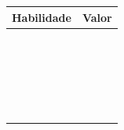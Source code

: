 \documentclass[a4paper,12pt]{article}
\begin{document}
\newpage %

\begin{multicols}{2}


\begin{center}
    \begin{tabular}{|m{6cm}|c|}
        \hline
        \textbf{Habilidade} & \textbf{Valor} \\
        \hline
        & \\
        \hline
        & \\
        \hline
        & \\
        \hline
        & \\
        \hline
        & \\
        \hline
        & \\
        \hline
        & \\
        \hline
        & \\
        \hline
        & \\
        \hline
        & \\
        \hline
        & \\
        \hline
        & \\
        \hline
        & \\
        \hline
        & \\
                \hline
        & \\
                \hline
        & \\
                \hline
        & \\
                \hline
        & \\
                \hline
        & \\
                \hline
        & \\
                \hline
        & \\
                \hline
        & \\
                \hline
        & \\
        \hline
    \end{tabular}
\end{center}



\end{multicols}
\end{document}
